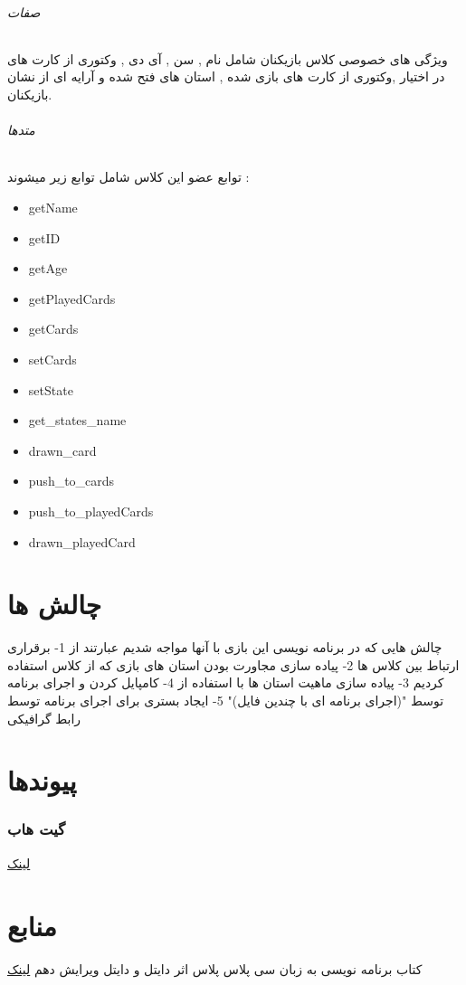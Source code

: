 \documentclass[pdf,titlepage,a4paper]{report}
\begin{document}
	\paragraph{صفات}
	ویژگی های خصوصی کلاس بازیکنان شامل نام , سن , آی دی , وکتوری از کارت های در اختیار ,وکتوری از کارت های بازی شده , استان های فتح شده و آرایه ای از نشان بازیکنان.

	\paragraph{متدها}
	توابع عضو این کلاس شامل توابع زیر میشوند :
	
	\begin{latin}
		\begin{itemize}
			\item getName
			\item getID 
			\item getAge 
			\item getPlayedCards 
			\item getCards 
			\item setCards 
			\item setState
			\item get\_states\_name
			\item drawn\_card
			\item push\_to\_cards
			\item push\_to\_playedCards
			\item drawn\_playedCard
		\end{itemize}
	\end{latin}
	
	\newpage
	
	
	
	\part{چالش ها}
	چالش هایی که در برنامه نویسی این بازی با آنها مواجه شدیم عبارتند از 
	1- برقراری ارتباط بین کلاس ها 
	2- پیاده سازی مجاورت بودن استان های بازی که از کلاس   استفاده کردیم
	3- پیاده سازی ماهیت استان ها با استفاده از 
	4- کامپایل کردن و اجرای برنامه توسط  "(اجرای برنامه ای با چندین فایل)"
    5- ایجاد بستری برای اجرای برنامه توسط رابط گرافیکی 
	\newpage
		
	\part{پیوندها}
	\section{گیت هاب}
	\href{https://github.com/Matin0789/Condottiere-.git}{لینک}

	\newpage
	
	
	
	\part{منابع}
	کتاب برنامه نویسی به زبان سی پلاس پلاس اثر دایتل و دایتل ویرایش دهم
	\href{https://www.geeksforgeeks.org/c-plus-plus/}{لینک}
\end{document}
